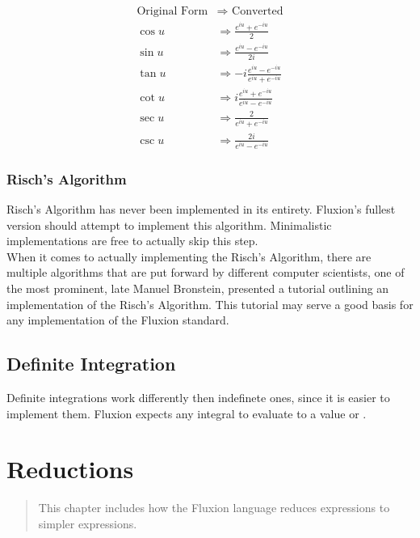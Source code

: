 \documentclass[11pt,a4paper]{book}
\begin{document}
\begin{equation}
\begin{split}
\text{Original Form} & \Rightarrow \text{ Converted}\\
\cos{u} &\Rightarrow \frac{e^{iu} + e^{-iu}}{2}\\
\sin{u} &\Rightarrow \frac{e^{iu} - e^{-iu}}{2i}\\
\tan{u} &\Rightarrow -i \frac{e^{iu} - e^{-iu}}{e^{iu} + e^{-iu}}\\
\cot{u} &\Rightarrow i \frac{e^{iu} + e^{-iu}}{e^{iu} - e^{-iu}}\\
\sec{u} &\Rightarrow \frac{2}{e^{iu} + e^{-iu}}\\
\csc{u} &\Rightarrow \frac{2i}{e^{iu} - e^{-iu}}
\end{split}
\end{equation}

\subsection{Risch's Algorithm}

Risch's Algorithm has never been implemented in its entirety. Fluxion's fullest version should attempt to implement this algorithm. Minimalistic implementations are free to actually skip this step.\\

When it comes to actually implementing the Risch's Algorithm, there are multiple algorithms that are put forward by different computer scientists, one of the most prominent, late Manuel Bronstein, presented a tutorial outlining an implementation of the Risch's Algorithm\cite{bronstein}. This tutorial may serve a good basis for any implementation of the Fluxion standard.

\section{Definite Integration}

Definite integrations work differently then indefinete ones, since it is easier to implement them. Fluxion expects any integral to evaluate to a value or .



\chapter{Reductions}

\vspace{1em}
\begin{quotation}
This chapter includes how the Fluxion language reduces expressions to simpler expressions.
\end{quotation}
\newpage
\end{document}
